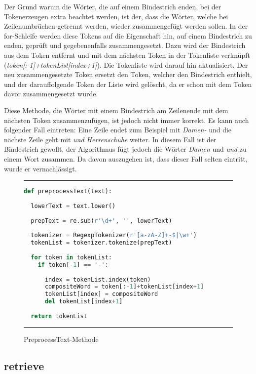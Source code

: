 Der Grund warum die Wörter, die auf einem Bindestrich enden, bei der Tokenerzeugen extra beachtet werden, ist der, dass die Wörter, welche bei Zeilenumbrüchen getrennt werden, wieder zusammengefügt werden sollen. In der for-Schleife werden diese Tokens auf die Eigenschaft hin, auf einem Bindestrich zu enden, geprüft und gegebenenfalls zusammengesetzt. Dazu wird der Bindestrich aus dem Token entfernt und mit dem nächsten Token in der Tokenliste verknüpft (\textit{token[:-1]+tokenList[index+1]}). Die Tokenliste wird darauf hin aktualisiert. Der neu zusammengesetzte Token ersetzt den Token, welcher den Bindestrich enthielt, und der darauffolgende Token der Liste wird gelöscht, da er schon mit dem Token davor zusammengesetzt wurde.

Diese Methode, die Wörter mit einem Bindestrich am Zeilenende mit dem nächsten Token zusammenzufügen, ist jedoch nicht immer korrekt. Es kann auch folgender Fall eintreten: Eine Zeile endet zum Beispiel mit \textit{Damen-} und die nächste Zeile geht mit \textit{und Herrenschuhe} weiter. In diesem Fall ist der Bindestrich gewollt, der Algorithmus fügt jedoch die Wörter \textit{Damen} und \textit{und} zu einem Wort zusammen. Da davon auszugehen ist, dass dieser Fall selten eintritt, wurde er vernachlässigt.

\begin{figure}
	\rule{\textwidth}{0.4pt}
		\begin{lstlisting}[language=Python]
def preprocessText(text):
    
  lowerText = text.lower()
    
  prepText = re.sub(r'\d+', '', lowerText)
            
  tokenizer = RegexpTokenizer(r'[a-zA-Z]+-$|\w+')
  tokenList = tokenizer.tokenize(prepText)
    
  for token in tokenList:
    if token[-1] == '-':
            
      index = tokenList.index(token)
      compositeWord = token[:-1]+tokenList[index+1]
      tokenList[index] = compositeWord
      del tokenList[index+1]
            
  return tokenList
		\end{lstlisting}
	\rule{\textwidth}{0.4pt}
	\caption{PreprocessText-Methode}
	\label{fig:preprocess}
\end{figure}

\subsection{retrieve}\label{retrieve}


